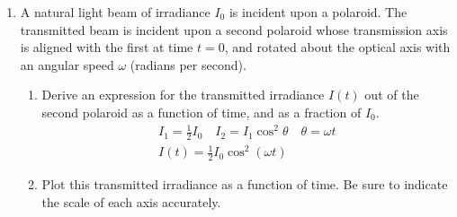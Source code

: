 \documentclass{article}
\begin{document}
\begin{enumerate}
  \item A natural light beam of irradiance $I_0$ is incident upon a polaroid. The
    transmitted beam is incident upon a second polaroid whose transmission axis
    is aligned with the first at time $t = 0$, and rotated about the optical axis
    with an angular speed $\omega$ (radians per second).
    \begin{enumerate}
      \item Derive an expression for the transmitted irradiance $I(t)$ out of the
        second polaroid as a function of time, and as a fraction of $I_0$.
        \begin{gather}
          I_1 = \frac{1}{2} I_0 \quad I_2 = I_1\cos^2\theta \quad \theta = \omega t \\
          I(t) = \frac{1}{2} I_0 \cos^2(\omega t)
        \end{gather}
      \item Plot this transmitted irradiance as a function of time. Be sure to
        indicate the scale of each axis accurately.
        \begin{figure}[htpb]
        \begin{center}
        \end{center}
        \caption{}%
        \label{fig:}
        \end{figure}
        

\end{enumerate}
\end{enumerate}
\end{document}
